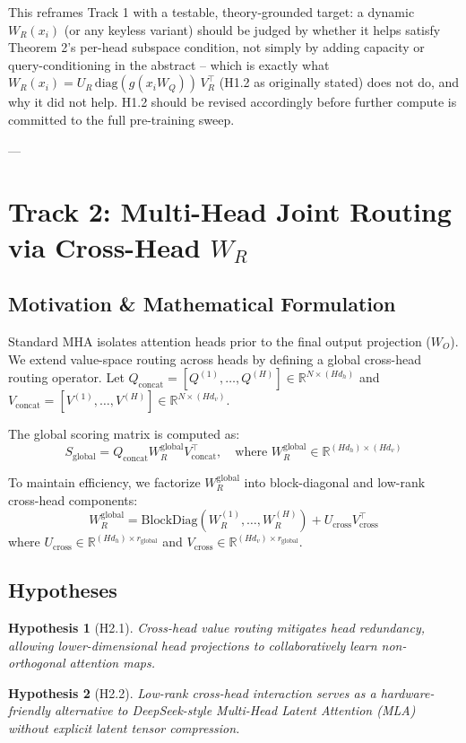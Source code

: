 \documentclass[11pt,a4paper]{article}
\newtheorem{hypothesis}{Hypothesis}
\begin{document}
This reframes Track 1 with a testable, theory-grounded target: a dynamic
$W_R(x_i)$ (or any keyless variant) should be judged by whether it helps
satisfy Theorem 2's per-head subspace condition, not simply by adding
capacity or query-conditioning in the abstract -- which is exactly what
$W_R(x_i) = U_R\,\mathrm{diag}(g(x_iW_Q))\,V_R^\top$ (H1.2 as originally
stated) does not do, and why it did not help. H1.2 should be revised
accordingly before further compute is committed to the full pre-training
sweep.

---

\section{Track 2: Multi-Head Joint Routing via Cross-Head $W_R$}

\subsection{Motivation \& Mathematical Formulation}
Standard MHA isolates attention heads prior to the final output projection ($W_O$). We extend value-space routing across heads by defining a global cross-head routing operator. Let $Q_{\text{concat}} = [Q^{(1)}, \dots, Q^{(H)}] \in \mathbb{R}^{N \times (H d_h)}$ and $V_{\text{concat}} = [V^{(1)}, \dots, V^{(H)}] \in \mathbb{R}^{N \times (H d_v)}$.

The global scoring matrix is computed as:
\begin{equation}
S_{\text{global}} = Q_{\text{concat}} W_R^{\text{global}} V_{\text{concat}}^\top, \quad \text{where } W_R^{\text{global}} \in \mathbb{R}^{(H d_h) \times (H d_v)}
\end{equation}

To maintain efficiency, we factorize $W_R^{\text{global}}$ into block-diagonal and low-rank cross-head components:
\begin{equation}
W_R^{\text{global}} = \text{BlockDiag}\left(W_R^{(1)}, \dots, W_R^{(H)}\right) + U_{\text{cross}} V_{\text{cross}}^\top
\end{equation}
where $U_{\text{cross}} \in \mathbb{R}^{(H d_h) \times r_{\text{global}}}$ and $V_{\text{cross}} \in \mathbb{R}^{(H d_v) \times r_{\text{global}}}$.

\subsection{Hypotheses}
\begin{hypothesis}[H2.1]
Cross-head value routing mitigates head redundancy, allowing lower-dimensional head projections to collaboratively learn non-orthogonal attention maps.
\end{hypothesis}
\begin{hypothesis}[H2.2]
Low-rank cross-head interaction serves as a hardware-friendly alternative to DeepSeek-style Multi-Head Latent Attention (MLA) without explicit latent tensor compression.
\end{hypothesis}
\end{document}

